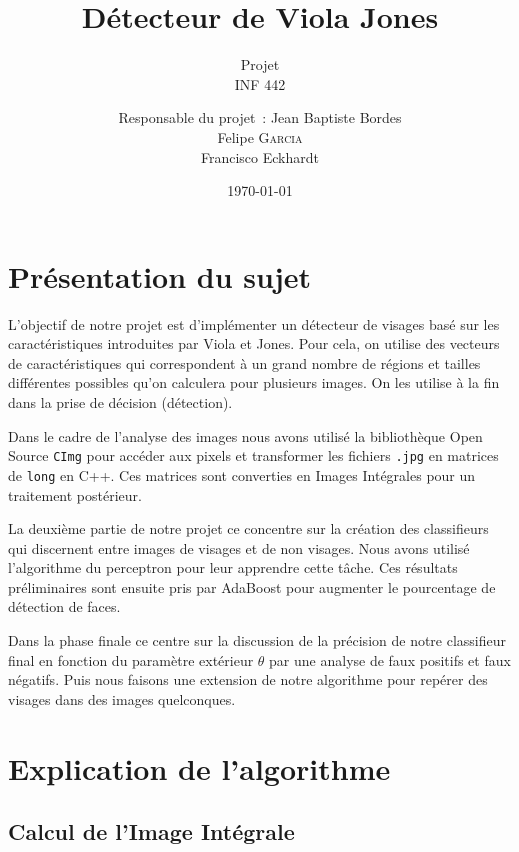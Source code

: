 \documentclass[a4paper, 12pt,twoside]{article}
\title{Détecteur de Viola Jones}
\subtitle{Projet \\ INF 442}
\author{
	Responsable du projet~: Jean Baptiste Bordes \\
        Felipe \textsc{Garcia} \\
        Francisco Eckhardt \\
        }
\date\today
\newcommand{\param}[1]{
\texttt{#1}
}
\begin{document}
    \maketitle
    \renewcommand{\baselinestretch}{1.1}
    \setlength{\parskip}{0.5em}
    \tableofcontents
    \clearpage

\section{Présentation du sujet}

	L’objectif de notre projet est d’implémenter un détecteur de visages basé sur les caractéristiques introduites par Viola et Jones. Pour cela, on utilise des vecteurs de caractéristiques qui correspondent à un grand nombre de régions et tailles différentes possibles qu’on calculera pour plusieurs images. On les utilise à la fin dans la prise de décision (détection). 
	
	Dans le cadre de l’analyse des images nous avons utilisé la bibliothèque Open Source \param{CImg} pour accéder aux pixels et transformer les fichiers \param{.jpg} en matrices de \param{long} en C++. Ces matrices sont converties en Images Intégrales pour un traitement postérieur.
	
	La deuxième partie de notre projet ce concentre sur la création des classifieurs qui discernent entre images de visages et de non visages. Nous avons utilisé l’algorithme du perceptron pour leur apprendre cette tâche. Ces résultats préliminaires sont ensuite pris par AdaBoost pour augmenter le pourcentage de détection de faces.
	
	Dans la phase finale ce centre sur la discussion de la précision de notre classifieur final en fonction du paramètre extérieur $\theta$ par une analyse de faux positifs et faux négatifs. Puis nous faisons une extension de notre algorithme pour repérer des visages dans des images quelconques.

\clearpage

\section{Explication de l'algorithme}


\subsection{Calcul de l'Image Intégrale}
	
\end{document}
